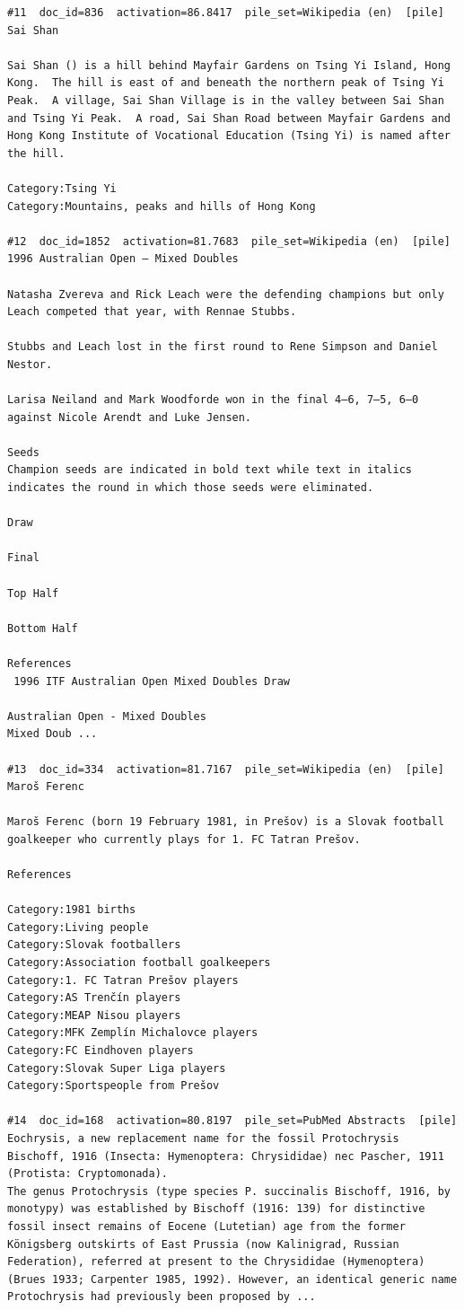 \begin{verbatim}
#11  doc_id=836  activation=86.8417  pile_set=Wikipedia (en)  [pile]
Sai Shan

Sai Shan () is a hill behind Mayfair Gardens on Tsing Yi Island, Hong Kong.  The hill is east of and beneath the northern peak of Tsing Yi Peak.  A village, Sai Shan Village is in the valley between Sai Shan and Tsing Yi Peak.  A road, Sai Shan Road between Mayfair Gardens and Hong Kong Institute of Vocational Education (Tsing Yi) is named after the hill.

Category:Tsing Yi
Category:Mountains, peaks and hills of Hong Kong

#12  doc_id=1852  activation=81.7683  pile_set=Wikipedia (en)  [pile]
1996 Australian Open – Mixed Doubles

Natasha Zvereva and Rick Leach were the defending champions but only Leach competed that year, with Rennae Stubbs.

Stubbs and Leach lost in the first round to Rene Simpson and Daniel Nestor.

Larisa Neiland and Mark Woodforde won in the final 4–6, 7–5, 6–0 against Nicole Arendt and Luke Jensen.

Seeds
Champion seeds are indicated in bold text while text in italics indicates the round in which those seeds were eliminated.

Draw

Final

Top Half

Bottom Half

References
 1996 ITF Australian Open Mixed Doubles Draw

Australian Open - Mixed Doubles
Mixed Doub ...

#13  doc_id=334  activation=81.7167  pile_set=Wikipedia (en)  [pile]
Maroš Ferenc

Maroš Ferenc (born 19 February 1981, in Prešov) is a Slovak football goalkeeper who currently plays for 1. FC Tatran Prešov.

References

Category:1981 births
Category:Living people
Category:Slovak footballers
Category:Association football goalkeepers
Category:1. FC Tatran Prešov players
Category:AS Trenčín players
Category:MEAP Nisou players
Category:MFK Zemplín Michalovce players
Category:FC Eindhoven players
Category:Slovak Super Liga players
Category:Sportspeople from Prešov

#14  doc_id=168  activation=80.8197  pile_set=PubMed Abstracts  [pile]
Eochrysis, a new replacement name for the fossil Protochrysis Bischoff, 1916 (Insecta: Hymenoptera: Chrysididae) nec Pascher, 1911 (Protista: Cryptomonada).
The genus Protochrysis (type species P. succinalis Bischoff, 1916, by monotypy) was established by Bischoff (1916: 139) for distinctive fossil insect remains of Eocene (Lutetian) age from the former Königsberg outskirts of East Prussia (now Kalinigrad, Russian Federation), referred at present to the Chrysididae (Hymenoptera) (Brues 1933; Carpenter 1985, 1992). However, an identical generic name Protochrysis had previously been proposed by ...


\end{verbatim}
